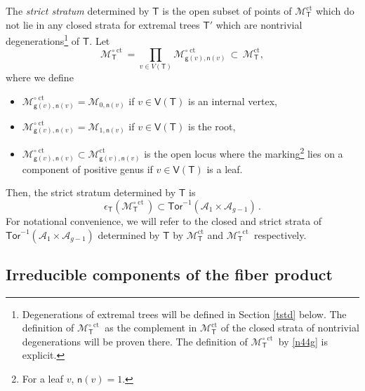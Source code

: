 \documentclass[11pt]{amsart}
\theoremstyle{definition}
\newcommand{\M}{\mathcal{M}}
\newcommand{\A}{\mathcal{A}}
\DeclareMathOperator{\ct}{ct}
\newcommand{\Tor}{\mathsf{Tor}}
\begin{document}
{The {\em strict stratum} determined by $\mathsf{T}$ is the open subset of points of $\M^{\ct}_\mathsf{T}$
which do not lie in any closed strata for extremal trees $\mathsf{T'}$ which are nontrivial 
degenerations{\footnote{Degenerations of extremal trees will be defined 
in Section \ref{tstd} below. The definition of $\mathcal{M}^{\circ\ct}_{\mathsf{T}}$
as the complement in $\mathcal{M}^{\ct}_{\mathsf{T}}$ of the closed strata
of nontrivial degenerations will be proven there.
The definition of $\mathcal{M}^{\circ\ct}_{\mathsf{T}}$ by \eqref{n44g} is explicit. 
}} of $\mathsf{T}$. Let 
\begin{equation} \label{n44g}
\M^{\circ \ct}_\mathsf{T}=\prod_{v\in V(\mathsf{T})} \M^{\circ\ct}_{\mathsf{g}(v),\mathsf{n}(v)}\, \subset \, \M^{ \ct}_\mathsf{T} ,
\end{equation}
where we define 
\begin{itemize}
    \item $\M^{\circ\ct}_{\mathsf{g}(v),\mathsf{n}(v)}= \M_{0,\mathsf{n}(v)}$ if $v\in \mathsf{V}(\mathsf{T})$ is an internal vertex, 
    \item $\M^{\circ\ct}_{\mathsf{g}(v),\mathsf{n}(v)}= \M_{1,\mathsf{n}(v)}$ if $v\in \mathsf V({\mathsf T})$ is the root, 
\item $\M^{\circ\ct}_{\mathsf{g}(v),\mathsf{n}(v)}\subset \M^{\ct}_{\mathsf{g}(v),\mathsf{n}(v)}$
is the open locus where the marking{\footnote{For a leaf $v$, $\mathsf{n}(v)=1$.}} lies on a component of positive genus
if $v\in \mathsf{V}(\mathsf{T})$ is a leaf. \end{itemize} Then, the strict stratum determined by $\mathsf{T}$ is 
$$\epsilon_\mathsf{T}(\M^{\circ \ct}_\mathsf{T})\subset  \Tor^{-1}(\A_1\times \A_{g-1})\, .$$
For notational convenience, we will refer to the closed and strict strata of 
$\Tor^{-1}(\A_1\times \A_{g-1})$
determined by $\mathsf{T}$ by $\M_{\mathsf{T}}^{\ct}$ and $\M_{\mathsf{T}}^{\circ \ct}$
respectively.
\subsection{Irreducible components of the fiber product}\label{settheory}



}
\end{document}
